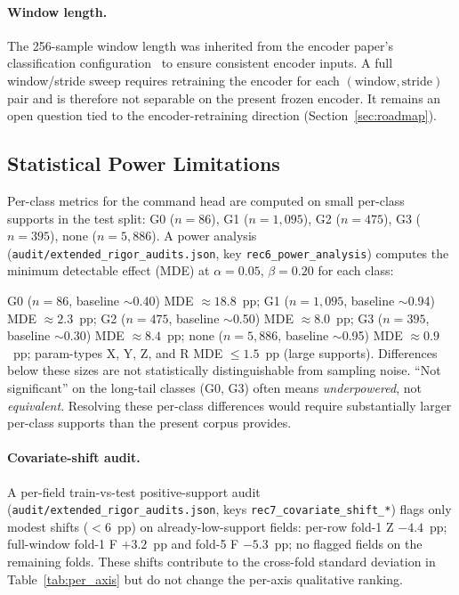 \documentclass[sensors,article,submit,moreauthors,pdftex]{Definitions/mdpi}
\begin{document}
\paragraph{Window length.} The 256-sample window length was inherited from the encoder paper's classification configuration~\cite{encoder_paper} to ensure consistent encoder inputs. A full window/stride sweep requires retraining the encoder for each $(\text{window}, \text{stride})$ pair and is therefore not separable on the present frozen encoder. It remains an open question tied to the encoder-retraining direction (Section~\ref{sec:roadmap}).

\subsection{Statistical Power Limitations}
\label{sec:lim-power}

Per-class metrics for the command head are computed on small per-class supports in the test split: G0 ($n\!=\!86$), G1 ($n\!=\!1{,}095$), G2 ($n\!=\!475$), G3 ($n\!=\!395$), none ($n\!=\!5{,}886$). A power analysis (\texttt{audit/extended\_rigor\_audits.json}, key \texttt{rec6\_power\_analysis}) computes the minimum detectable effect (MDE) at $\alpha\!=\!0.05$, $\beta\!=\!0.20$ for each class:

G0 ($n\!=\!86$, baseline $\sim$0.40) MDE $\approx 18.8$~pp; G1 ($n\!=\!1{,}095$, baseline $\sim$0.94) MDE $\approx 2.3$~pp; G2 ($n\!=\!475$, baseline $\sim$0.50) MDE $\approx 8.0$~pp; G3 ($n\!=\!395$, baseline $\sim$0.30) MDE $\approx 8.4$~pp; none ($n\!=\!5{,}886$, baseline $\sim$0.95) MDE $\approx 0.9$~pp; param-types X, Y, Z, and R MDE $\le 1.5$~pp (large supports). Differences below these sizes are not statistically distinguishable from sampling noise. ``Not significant'' on the long-tail classes (G0, G3) often means \emph{underpowered}, not \emph{equivalent}. Resolving these per-class differences would require substantially larger per-class supports than the present corpus provides.

\paragraph{Covariate-shift audit.}\label{sec:lim-covariate} A per-field train-vs-test positive-support audit (\texttt{audit/extended\_rigor\_audits.json}, keys \texttt{rec7\_covariate\_shift\_*}) flags only modest shifts ($<\!6$~pp) on already-low-support fields: per-row fold-1 Z $-4.4$~pp; full-window fold-1 F $+3.2$~pp and fold-5 F $-5.3$~pp; no flagged fields on the remaining folds. These shifts contribute to the cross-fold standard deviation in Table~\ref{tab:per_axis} but do not change the per-axis qualitative ranking.
\end{document}
